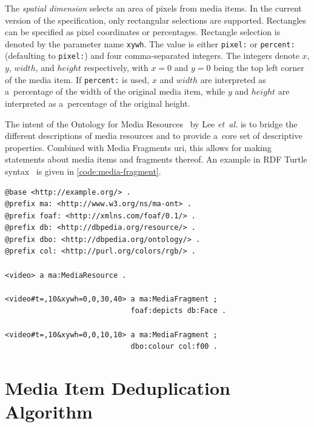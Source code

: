 \documentclass{article}
\begin{document}
The \emph{spatial dimension} selects an area of pixels from media items.
In the current version of the specification,
only rectangular selections are supported.
Rectangles can be specified as pixel coordinates or percentages.
Rectangle selection is denoted by the parameter name \texttt{xywh}.
The value is either \texttt{pixel:} or \texttt{percent:}
(defaulting to \texttt{pixel:}) and four comma-separated integers.
The integers denote $ x $, $ y $, $ width $, and $ height $ respectively,
with $ x = 0 $ and $ y = 0 $ being the top left corner of the media item.
If \texttt{percent:} is used,
$ x $ and $ width $ are interpreted as a~percentage
of the width of the original media item,
while $ y $ and $ height $ are interpreted as a~percentage
of the original height.

The intent of the Ontology for Media Resources~\cite{lee2012mediaontology}
by Lee \emph{et~al.} is to bridge the different descriptions of media resources
and to provide a~core set of descriptive properties.
Combined with Media Fragments {\sc uri},
this allows for making statements about media items and fragments thereof.
An example in RDF Turtle syntax~\cite{prudhommeaux2013turtle}
is given in \autoref{code:media-fragment}.

\begin{lstlisting}[caption={Description of two 10~sec long media fragments:
  \textit{(i)}~a~tile of dimensions $ 30 \times 40 $ pixels
  starting at pixel coordinates $ (0, 0) $
  that contains a~face; and
  \textit{(ii)}~a~tile of dimensions $ 10 \times 10 $ pixels
  starting at pixel coordinates $ (0, 0) $ of red color},
  label=code:media-fragment, float=b!]
@base <http://example.org/> .
@prefix ma: <http://www.w3.org/ns/ma-ont> .
@prefix foaf: <http://xmlns.com/foaf/0.1/> .
@prefix db: <http://dbpedia.org/resource/> .
@prefix dbo: <http://dbpedia.org/ontology/> .
@prefix col: <http://purl.org/colors/rgb/> .

<video> a ma:MediaResource .

<video#t=,10&xywh=0,0,30,40> a ma:MediaFragment ;
                             foaf:depicts db:Face .
                             
<video#t=,10&xywh=0,0,10,10> a ma:MediaFragment ;
                             dbo:colour col:f00 .
\end{lstlisting}

\section{Media Item Deduplication Algorithm}
\label{sec:media-item-deduplication-algorithm}
\end{document}
